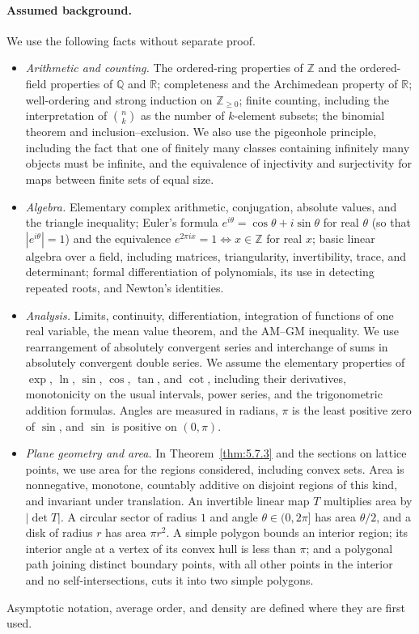 \documentclass[11pt]{article}
\theoremstyle{ntstyle}
\begin{document}
\paragraph*{Assumed background.}
We use the following facts without separate proof.
\begin{itemize}
  \item \emph{Arithmetic and counting.} The ordered-ring properties of $\mathbb{Z}$ and the ordered-field properties of $\mathbb{Q}$ and $\mathbb{R}$; completeness and the Archimedean property of $\mathbb{R}$; well-ordering and strong induction on $\mathbb{Z}_{\ge0}$;
    finite counting, including the interpretation of $\binom{n}{k}$ as the number of $k$-element subsets; the binomial theorem and inclusion--exclusion.
    We also use the pigeonhole principle, including the fact that one of finitely many classes containing infinitely many objects must be infinite, and the equivalence of injectivity and surjectivity for maps between finite sets of equal size.
  \item \emph{Algebra.} Elementary complex arithmetic, conjugation, absolute values, and the triangle inequality; Euler's formula $e^{i\theta}=\cos\theta+i\sin\theta$ for real $\theta$ (so that $|e^{i\theta}|=1$) and the equivalence $e^{2\pi i x}=1\iff x\in\mathbb{Z}$ for real $x$; basic linear algebra over a field, including matrices, triangularity, invertibility, trace, and determinant; formal differentiation of polynomials, its use in detecting repeated roots, and Newton's identities.
  \item \emph{Analysis.} Limits, continuity, differentiation, integration of functions of one real variable, the mean value theorem, and the AM--GM inequality.
    We use rearrangement of absolutely convergent series and interchange of sums in absolutely convergent double series.
    We assume the elementary properties of $\exp$, $\ln$, $\sin$, $\cos$, $\tan$, and $\cot$, including their derivatives, monotonicity on the usual intervals, power series, and the trigonometric addition formulas.
    Angles are measured in radians, $\pi$ is the least positive zero of $\sin$, and $\sin$ is positive on $(0,\pi)$.
  \item \emph{Plane geometry and area.} In Theorem~\ref{thm:5.7.3} and the sections on lattice points, we use area for the regions considered, including convex sets.
    Area is nonnegative, monotone, countably additive on disjoint regions of this kind, and invariant under translation.
    An invertible linear map $T$ multiplies area by $|\det T|$.
    A circular sector of radius $1$ and angle $\theta\in(0,2\pi]$ has area $\theta/2$, and a disk of radius $r$ has area $\pi r^2$.
    A simple polygon bounds an interior region; its interior angle at a vertex of its convex hull is less than $\pi$; and a polygonal path joining distinct boundary points, with all other points in the interior and no self-intersections, cuts it into two simple polygons.
\end{itemize}
Asymptotic notation, average order, and density are defined where they are first used.
\end{document}
